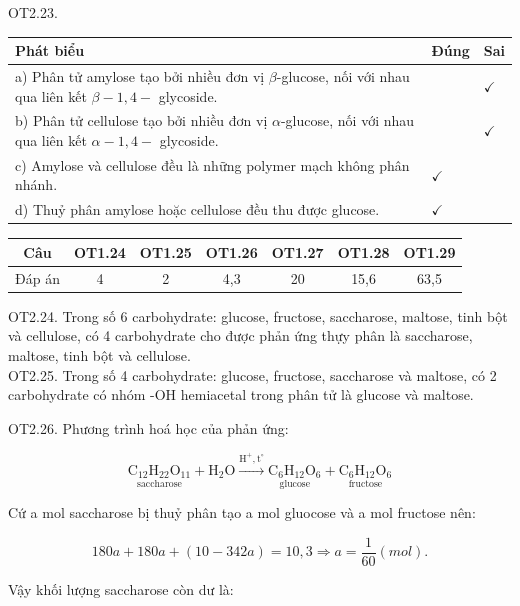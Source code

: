 \documentclass[10pt]{article}
\begin{document}
OT2.23.

\begin{center}
\begin{tabular}{|l|l|l|}
\hline
Phát biểu & Đúng & Sai \\
\hline
a) Phân tử amylose tạo bởi nhiều đơn vị $\beta$-glucose, nối với nhau qua liên kết $\beta-1,4-$ glycoside. &  & $\checkmark$ \\
\hline
b) Phân tử cellulose tạo bởi nhiều đơn vị $\alpha$-glucose, nối với nhau qua liên kết $\alpha-1,4-$ glycoside. &  & $\checkmark$ \\
\hline
c) Amylose và cellulose đều là những polymer mạch không phân nhánh. & $\checkmark$ &  \\
\hline
d) Thuỷ phân amylose hoặc cellulose đều thu được glucose. & $\checkmark$ &  \\
\hline
\end{tabular}
\end{center}

\begin{center}
\begin{tabular}{|c|c|c|c|c|c|c|}
\hline
Câu & OT1.24 & OT1.25 & OT1.26 & OT1.27 & OT1.28 & OT1.29 \\
\hline
Đáp án & 4 & 2 & 4,3 & 20 & 15,6 & 63,5 \\
\hline
\end{tabular}
\end{center}

OT2.24. Trong số 6 carbohydrate: glucose, fructose, saccharose, maltose, tinh bột và cellulose, có 4 carbohydrate cho được phản ứng thựy phân là saccharose, maltose, tinh bột và cellulose.\\
OT2.25. Trong số 4 carbohydrate: glucose, fructose, saccharose và maltose, có 2 carbohydrate có nhóm -OH hemiacetal trong phân tử là glucose và maltose.

OT2.26. Phương trình hoá học của phản ứng:

$$
\underset{\text { saccharose }}{\mathrm{C}_{12} \mathrm{H}_{22} \mathrm{O}_{11}}+\mathrm{H}_{2} \mathrm{O} \xrightarrow{\mathrm{H}^{+}, \mathrm{t}^{\circ}} \underset{\text { glucose }}{\mathrm{C}_{6} \mathrm{H}_{12} \mathrm{O}_{6}}+\underset{\text { fructose }}{\mathrm{C}_{6} \mathrm{H}_{12} \mathrm{O}_{6}}
$$

Cứ a mol saccharose bị thuỷ phân tạo a mol gluocose và a mol fructose nên:

$$
180 a+180 a+(10-342 a)=10,3 \Rightarrow a=\frac{1}{60}(m o l) .
$$

Vậy khối lượng saccharose còn dư là:
\end{document}
